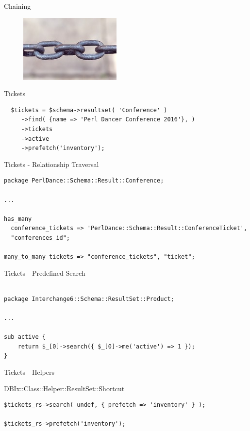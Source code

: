 \begin{frame}{Chaining}
  \begin{figure}[!ht]
    \begin{center}
      \includegraphics{img/chains.jpg}
    \end{center}
  \end{figure}
\end{frame}

\begin{frame}[fragile]{Tickets}

\begin{lstlisting}
  $tickets = $schema->resultset( 'Conference' )
     ->find( {name => 'Perl Dancer Conference 2016'}, )
     ->tickets
     ->active
     ->prefetch('inventory');
\end{lstlisting}
\end{frame}

\begin{frame}[fragile]{Tickets - Relationship Traversal}
\begin{lstlisting}
package PerlDance::Schema::Result::Conference;

...

has_many
  conference_tickets => 'PerlDance::Schema::Result::ConferenceTicket',
  "conferences_id";

many_to_many tickets => "conference_tickets", "ticket";

\end{lstlisting}
\end{frame}

\begin{frame}[fragile]{Tickets - Predefined Search}
\begin{lstlisting}

package Interchange6::Schema::ResultSet::Product;

...

sub active {
    return $_[0]->search({ $_[0]->me('active') => 1 });
}

\end{lstlisting}
\end{frame}

\begin{frame}[fragile]{Tickets - Helpers}

DBIx::Class::Helper::ResultSet::Shortcut

\begin{lstlisting}
$tickets_rs->search( undef, { prefetch => 'inventory' } );

$tickets_rs->prefetch('inventory');
\end{lstlisting}
\end{frame}

